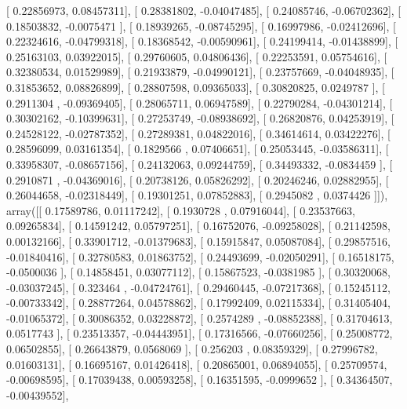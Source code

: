 \documentclass{article}
\begin{document}
       [ 0.22856973,  0.08457311],
       [ 0.28381802, -0.04047485],
       [ 0.24085746, -0.06702362],
       [ 0.18503832, -0.0075471 ],
       [ 0.18939265, -0.08745295],
       [ 0.16997986, -0.02412696],
       [ 0.22324616, -0.04799318],
       [ 0.18368542, -0.00590961],
       [ 0.24199414, -0.01438899],
       [ 0.25163103,  0.03922015],
       [ 0.29760605,  0.04806436],
       [ 0.22253591,  0.05754616],
       [ 0.32380534,  0.01529989],
       [ 0.21933879, -0.04990121],
       [ 0.23757669, -0.04048935],
       [ 0.31853652,  0.08826899],
       [ 0.28807598,  0.09365033],
       [ 0.30820825,  0.0249787 ],
       [ 0.2911304 , -0.09369405],
       [ 0.28065711,  0.06947589],
       [ 0.22790284, -0.04301214],
       [ 0.30302162, -0.10399631],
       [ 0.27253749, -0.08938692],
       [ 0.26820876,  0.04253919],
       [ 0.24528122, -0.02787352],
       [ 0.27289381,  0.04822016],
       [ 0.34614614,  0.03422276],
       [ 0.28596099,  0.03161354],
       [ 0.1829566 ,  0.07406651],
       [ 0.25053445, -0.03586311],
       [ 0.33958307, -0.08657156],
       [ 0.24132063,  0.09244759],
       [ 0.34493332, -0.0834459 ],
       [ 0.2910871 , -0.04369016],
       [ 0.20738126,  0.05826292],
       [ 0.20246246,  0.02882955],
       [ 0.26044658, -0.02318449],
       [ 0.19301251,  0.07852883],
       [ 0.2945082 ,  0.0374426 ]]), array([[ 0.17589786,  0.01117242],
       [ 0.1930728 ,  0.07916044],
       [ 0.23537663,  0.09265834],
       [ 0.14591242,  0.05797251],
       [ 0.16752076, -0.09258028],
       [ 0.21142598,  0.00132166],
       [ 0.33901712, -0.01379683],
       [ 0.15915847,  0.05087084],
       [ 0.29857516, -0.01840416],
       [ 0.32780583,  0.01863752],
       [ 0.24493699, -0.02050291],
       [ 0.16518175, -0.0500036 ],
       [ 0.14858451,  0.03077112],
       [ 0.15867523, -0.0381985 ],
       [ 0.30320068, -0.03037245],
       [ 0.323464  , -0.04724761],
       [ 0.29460445, -0.07217368],
       [ 0.15245112, -0.00733342],
       [ 0.28877264,  0.04578862],
       [ 0.17992409,  0.02115334],
       [ 0.31405404, -0.01065372],
       [ 0.30086352,  0.03228872],
       [ 0.2574289 , -0.08852388],
       [ 0.31704613,  0.0517743 ],
       [ 0.23513357, -0.04443951],
       [ 0.17316566, -0.07660256],
       [ 0.25008772,  0.06502855],
       [ 0.26643879,  0.0568069 ],
       [ 0.256203  ,  0.08359329],
       [ 0.27996782,  0.01603131],
       [ 0.16695167,  0.01426418],
       [ 0.20865001,  0.06894055],
       [ 0.25709574, -0.00698595],
       [ 0.17039438,  0.00593258],
       [ 0.16351595, -0.0999652 ],
       [ 0.34364507, -0.00439552],
\end{document}
